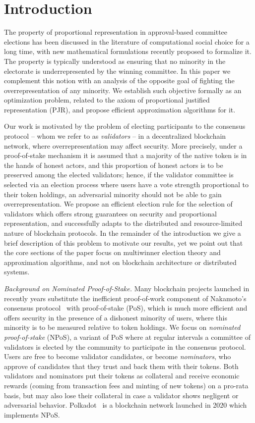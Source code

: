 \section{Introduction}

The property of proportional representation in approval-based committee elections has been discussed in the literature of computational social choice for a long time, with new mathematical formulations recently proposed to formalize it. 
The property is typically understood as ensuring that no minority in the electorate is underrepresented by the winning committee. 
In this paper we complement this notion with an analysis of the opposite goal of fighting the overrepresentation of any minority. 
We establish such objective formally as an optimization problem, related to the axiom of proportional justified representation (PJR), and propose efficient approximation algorithms for it. 

Our work is motivated by the problem of electing participants to the consensus protocol -- whom we refer to as \emph{validators} -- in a decentralized blockchain network, where overrepresentation may affect security. 
More precisely, under a proof-of-stake mechanism it is assumed that a majority of the native token is in the hands of honest actors, and this proportion of honest actors is to be preserved among the elected validators; 
hence, if the validator committee is selected via an election process where users have a vote strength proportional to their token holdings, an adversarial minority should not be able to gain overrepresentation. 
We propose an efficient election rule for the selection of validators which offers strong guarantees on security and proportional representation, and successfully adapts to the distributed and resource-limited nature of blockchain protocols. 
In the remainder of the introduction we give a brief description of this problem to motivate our results, yet we point out that the core sections of the paper focus on multiwinner election theory and approximation algorithms, and not on blockchain architecture or distributed systems.

\emph{Background on Nominated Proof-of-Stake.}
Many blockchain projects launched in recently years substitute the inefficient proof-of-work component of Nakamoto's consensus protocol~\cite{nakamoto2019bitcoin} with proof-of-stake (PoS), which is much more efficient and offers security in the presence of a dishonest minority of users, where this minority is to be measured relative to token holdings. 
We focus on \emph{nominated proof-of-stake} (NPoS), a variant of PoS where at regular intervals a committee of validators is elected by the community to participate in the consensus protocol. 
Users are free to become validator candidates, or become \emph{nominators}, who approve of candidates that they trust and back them with their tokens. 
Both validators and nominators put their tokens as collateral and receive economic rewards (coming from transaction fees and minting of new tokens) on a pro-rata basis, but may also lose their collateral in case a validator shows negligent or adversarial behavior.
Polkadot~\cite{burdges2020overview} is a blockchain network launched in 2020 which implements NPoS.

